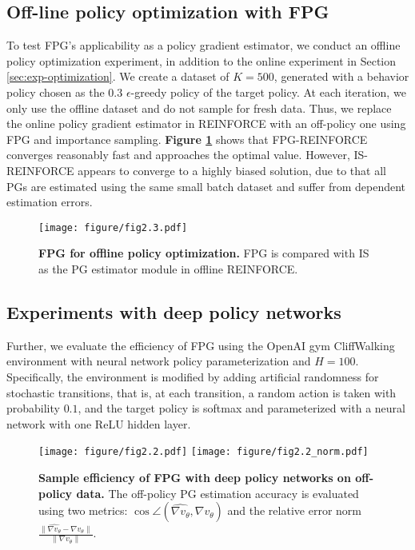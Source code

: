 \documentclass{article}
\numberwithin{equation}{section}
\begin{document}
\subsection{Off-line policy optimization with FPG}
To test FPG's applicability as a policy gradient estimator, we conduct an offline policy optimization experiment, in addition to the online experiment in Section \ref{sec:exp-optimization}. We create a dataset of $K=500$, generated with a behavior policy chosen as the $0.3$ $\epsilon$-greedy policy of the target policy. At each iteration, we only use the offline dataset and do not sample for fresh data. Thus, we replace the online policy gradient estimator in REINFORCE with an off-policy one using FPG and importance sampling. \textbf{Figure \ref{fig:FrozenLake_off}} shows that FPG-REINFORCE converges reasonably fast and approaches the optimal value. However, IS-REINFORCE appears to converge to a highly biased solution, due to that all PGs are estimated using the same small batch dataset and suffer from dependent estimation errors.

\begin{figure}[!t]
 \centering
 \texttt{[image: figure/fig2.3.pdf]}
\caption{\textbf{FPG for offline policy optimization.} FPG is compared with IS as the PG estimator module in offline REINFORCE. }
\label{fig:FrozenLake_off}
\end{figure}

\subsection{Experiments with deep policy networks}
Further, we evaluate the efficiency of FPG  using the OpenAI gym CliffWalking environment with neural network policy parameterization and $H=100$. Specifically, the environment is modified by adding artificial randomness for stochastic transitions, that is, at each transition, a random action is taken with probability $0.1$, and the target policy is softmax and parameterized with a neural network with one ReLU hidden layer. 

\def\grad{\nabla}
\def\hat{\widehat}
\begin{figure}[!t]
 \centering
 \texttt{[image: figure/fig2.2.pdf]}
  \texttt{[image: figure/fig2.2\_norm.pdf]}
\caption{\textbf{Sample efficiency of FPG with deep policy networks on off-policy data.} The off-policy PG estimation accuracy is evaluated using two metrics: $\cos\angle (\hat{\grad v_{\theta}}, \grad v_{\theta})$ and the relative error norm $\frac{\| \hat{\grad v_{\theta}} -  \grad v_{\theta}\| }{\|\grad v_{\theta}\|}$. }
\label{fig:CliffWalking_1}
\end{figure}
\end{document}

